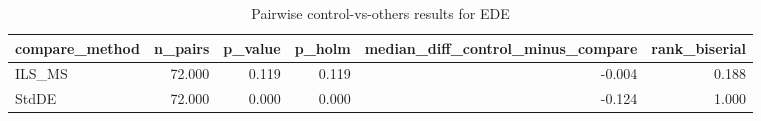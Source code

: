 \begin{table}[!t]
\centering
\caption{Pairwise control-vs-others results for EDE}
\label{tab:posthoc_holm_generated}
\begin{tabular}{lrrrrr}
\toprule
compare_method & n_pairs & p_value & p_holm & median_diff_control_minus_compare & rank_biserial \\
\midrule
ILS_MS & 72.000 & 0.119 & 0.119 & -0.004 & 0.188 \\
StdDE & 72.000 & 0.000 & 0.000 & -0.124 & 1.000 \\
\bottomrule
\end{tabular}

\end{table}